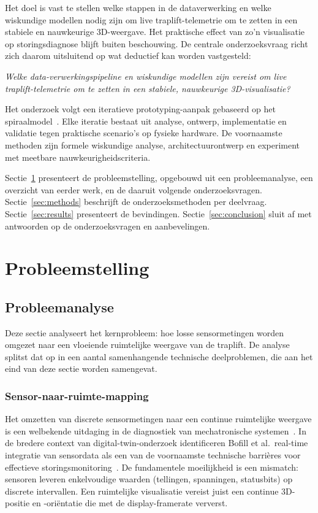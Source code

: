 \documentclass[10pt, a4paper, twocolumn]{article}
\begin{document}
Het doel is vast te stellen welke stappen in de dataverwerking en welke wiskundige modellen nodig zijn om live traplift-telemetrie om te zetten in een stabiele en nauwkeurige 3D-weergave. Het praktische effect van zo'n visualisatie op storingsdiagnose blijft buiten beschouwing. De centrale onderzoeksvraag richt zich daarom uitsluitend op wat deductief kan worden vastgesteld:

\textit{Welke data-verwerkingspipeline en wiskundige modellen zijn vereist om
live traplift-telemetrie om te zetten in een stabiele, nauwkeurige
3D-visualisatie?}

Het onderzoek volgt een iteratieve prototyping-aanpak gebaseerd op het
spiraalmodel~\cite{boehm1988spiral}. Elke iteratie bestaat uit analyse, ontwerp,
implementatie en validatie tegen praktische scenario's op fysieke hardware.
De voornaamste methoden zijn formele wiskundige analyse, architectuurontwerp en
experiment met meetbare nauwkeurigheidscriteria.

Sectie~\ref{sec:problem-statement} presenteert de probleemstelling, opgebouwd
uit een probleemanalyse, een overzicht van eerder werk, en de daaruit volgende
onderzoeksvragen. Sectie~\ref{sec:methods} beschrijft de onderzoeksmethoden per
deelvraag. Sectie~\ref{sec:results} presenteert de bevindingen.
Sectie~\ref{sec:conclusion} sluit af met antwoorden op de onderzoeksvragen en
aanbevelingen.

\section{Probleemstelling}
\label{sec:problem-statement}

\subsection{Probleemanalyse}
\label{sec:problem-analysis}

Deze sectie analyseert het kernprobleem: hoe losse sensormetingen worden omgezet
naar een vloeiende ruimtelijke weergave van de traplift. De analyse splitst dat op
in een aantal samenhangende technische deelproblemen, die aan het eind van deze
sectie worden samengevat.

\subsubsection{Sensor-naar-ruimte-mapping}
Het omzetten van discrete sensormetingen naar een continue ruimtelijke weergave
is een welbekende uitdaging in de diagnostiek van mechatronische
systemen~\cite{grieves2017digitaltwin}. In de bredere context van
digital-twin-onderzoek identificeren Bofill et al.\ real-time integratie van
sensordata als een van de voornaamste technische barrières voor effectieve
storingsmonitoring~\cite{bofill2023digitaltwin}. De fundamentele moeilijkheid is een mismatch: sensoren leveren enkelvoudige
waarden (tellingen, spanningen, statusbits) op discrete intervallen. Een
ruimtelijke visualisatie vereist juist een continue 3D-positie en -oriëntatie
die met de display-framerate ververst.
\end{document}
